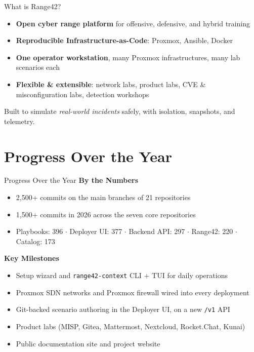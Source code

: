 \documentclass[aspectratio=169]{beamer}
\begin{document}
\begin{frame}{What is Range42?}
  \begin{itemize}
    \item \textbf{Open cyber range platform} for offensive, defensive, and hybrid training
    \item \textbf{Reproducible Infrastructure-as-Code}: Proxmox, Ansible, Docker
    \item \textbf{One operator workstation}, many Proxmox infrastructures, many lab scenarios each
    \item \textbf{Flexible \& extensible}: network labs, product labs, CVE \& misconfiguration labs, detection workshops
  \end{itemize}
  \begin{tcolorbox}
    \faInfoCircle\; Built to simulate \emph{real-world incidents} safely, with isolation, snapshots, and telemetry.
  \end{tcolorbox}
\end{frame}

\section{Progress Over the Year}

\begin{frame}[shrink=14]{Progress Over the Year \; \faChartLine}
  \color{cyber-ink}
  \textbf{By the Numbers}
  \begin{itemize}
    \item \alert{2{,}500+ commits} on the main branches of \alert{21 repositories}
    \item \alert{1{,}500+ commits in 2026} across the seven core repositories
    \item Playbooks: 396 \;$\cdot$\; Deployer UI: 377 \;$\cdot$\; Backend API: 297 \;$\cdot$\; Range42: 220 \;$\cdot$\; Catalog: 173
  \end{itemize}
  \vspace{1mm}
  \textbf{Key Milestones}
  \begin{itemize}
    \item \alert{Setup wizard} and \alert{\texttt{range42-context}} CLI + TUI for daily operations
    \item \alert{Proxmox SDN networks} and \alert{Proxmox firewall} wired into every deployment
    \item \alert{Git-backed scenario authoring} in the Deployer UI, on a new \texttt{/v1} API
    \item \alert{Product labs} (MISP, Gitea, Mattermost, Nextcloud, Rocket.Chat, Kunai)
    \item \alert{Public documentation site} and \alert{project website}
  \end{itemize}
\end{frame}
\end{document}
